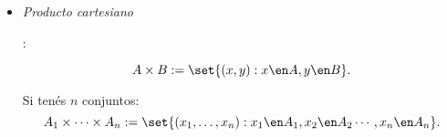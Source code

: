 \begin{itemize}[label={\tiny{}}]
        En las tablas de verdad que un elemento esté en un conjunto, $x \en A$ es equivalente a decir que la proposición $A$ es verdadera.
        En mi cabeza es más fácil recordar las tablas en conjuntos que en ... lo otro.
        \[
          \begin{array}{|c|c|c|c|c|c|c|c|}
            \hline
            x \en A & x \en B & x \en A^c & x \en A \inter B & x \en A \union B & x \en \subconjuntoYequivalente & x \en A \triangle B & A - B \\\rowcolor{Cerulean!10}
            \hline
            V       & V       & F         & V                & V                & V                              & F                   & F     \\
            V       & F       & F         & F                & V                & F                              & V                   & V     \\\rowcolor{Cerulean!10}
            F       & V       & V         & F                & V                & V                              & V                   & F     \\
            F       & F       & V         & F                & F                & V                              & F                   & F     \\
            \hline
          \end{array}
        \]

        \hypertarget{teoria-1:contrareciproco}{\textit{Probar por contrarrecíproco:}}
        Cuando para probar $p \entonces q$ se prueba en su lugar $\neg q \entonces \neg p$ se dice que es
        una \textit{demostración
          por contrarrecíproco}.\par

        \hypertarget{teoria-1:absurdo}{\textit{Probar por absurdo:}}
        Cuando para probar $p \entonces q$ se prueba en su lugar $p \land \neg q$ para llegar así
        a una contradicción, se dice que es una demostración por reducción al absurdo.

  \item \hypertarget{teoria-1:productoCartesiano}{\textit{Producto cartesiano}}:\par
        $$
          A \times B := \set{(x,y) : x\en A, y \en B}.
        $$

        Si tenés $n$ conjuntos:
        $$
          A_1 \times \cdots \times A_n := \set{(x_1,\dots,x_n): x_1 \en A_1, x_2 \en A_2 \cdots, x_n \en A_n}.
        $$


\end{itemize}
